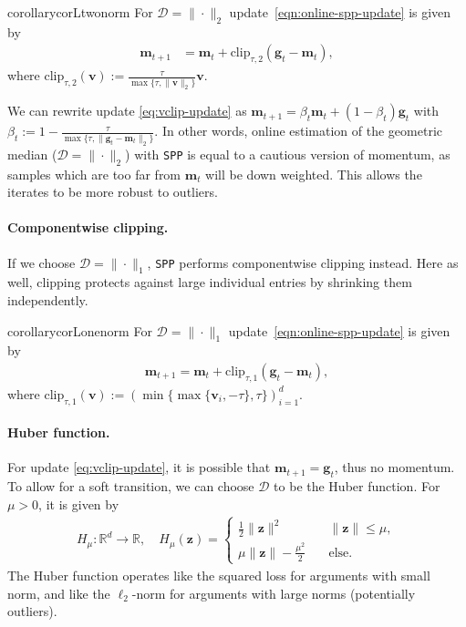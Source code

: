 \documentclass[10pt]{article} %
\renewcommand{\vec}[1]{\bm{#1}}
\newcommand{\R}{\mathbb{R}}
\newcommand{\dist}{\mathcal{D}}
\newcommand{\cclip}[1]{\mathrm{clip}_{#1,1}}
\newcommand{\vclip}[1]{\mathrm{clip}_{#1,2}}
\newcommand{\SPP}{\texttt{SPP}}
\begin{document}
\begin{restatable}{corollary}{corLtwonorm}\label{cor:L2}
For $\dist = \|\cdot\|_2$ update~\eqref{eqn:online-spp-update} is given by 
\begin{align}
        \vec{m}_{t+1} &= \vec{m}_t + \vclip{\tau}(\vec{g}_t - \vec{m}_t),  \label{eq:vclip-update}
\end{align}
where $\vclip{\tau}(\vec{v}) :=  \frac{\tau }{\max\{\tau, \|\vec{v}\|_2 \}} \vec{v}$.
\end{restatable}
We can rewrite update \eqref{eq:vclip-update} as $\vec{m}_{t+1} = \beta_t \vec{m}_t + (1-\beta_t) \vec{g}_t$ with $\beta_t:= 1-\tfrac{\tau}{\max\{\tau, \|\vec{g}_t-\vec{m}_t\|_2\}}$. In other words, online estimation of the geometric median ($\dist = \|\cdot\|_2$) with \SPP{} is equal to a cautious version of momentum, as samples which are too far from $\vec{m}_t$ will
be down weighted. This allows the iterates to be more robust to outliers.

\paragraph{Componentwise clipping.}  If we choose $\dist= \|\cdot\|_1$, \SPP{} performs componentwise clipping instead. Here as well, clipping protects against large individual entries by shrinking them independently.
\begin{restatable}{corollary}{corLonenorm}\label{cor:L1}
For $\dist= \|\cdot\|_1$ update~\eqref{eqn:online-spp-update} is given by
    \begin{align}
        \vec{m}_{t+1} = \vec{m}_t + \cclip{\tau}(\vec{g}_t - \vec{m}_t),  \label{eq:cclip-update}
    \end{align}
     where $\cclip{\tau}(\vec{v}) := \left(  \min\{\max\{\vec{v}_i, - \tau\} , \tau\}\right)_{i=1}^d$.
\end{restatable}

\paragraph{Huber function.} For update \eqref{eq:vclip-update}, it is possible that $\vec{m}_{t+1} = \vec{g}_t$, thus no momentum. To allow for a soft transition, we can choose $\dist$ to be the Huber function. For $\mu > 0$, it is given by
\begin{align*}
    H_{\mu}: \R^d \to \R, \quad H_{\mu}(\vec{z}) = \begin{cases}
    \frac{1}{2}\|\vec{z}\|^2 &\quad \|\vec{z}\| \leq \mu,\\
    \mu \|\vec{z}\| - \frac{\mu^2}{2} &\quad \text{else}.
\end{cases}
\end{align*}
The Huber function operates like the squared loss for arguments with small norm, and like the $\ell_2$-norm for arguments with large norms (potentially outliers). 
\end{document}

